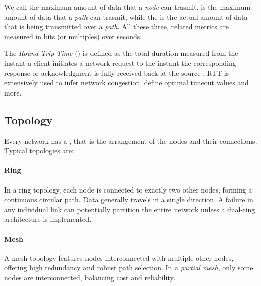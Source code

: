 We call  the maximum amount of data that a \emph{node} can trasmit.
 is the maximum amount of data that a \emph{path} can trasmit, while the  is the actual amount of data that is being transmitted over a \emph{path}.
All these three, related metrics are measured in bits (or multiples) over seconds.

The \emph{Round-Trip Time} () is defined as the total duration measured from the instant a client initiates a network request to the instant the corresponding response or acknowledgment is fully received back at the source \cite{rfc2681}. 
RTT is extensively used to infer network congestion, define optimal timeout values and more.

\subsection{Topology}
Every network has a , that is the arrangement of the nodes and their connections.
Typical topologies are:

\paragraph{Ring}
In a ring topology, each node is connected to exactly two other nodes, forming a continuous circular path. Data generally travels in a single direction. A failure in any individual link can potentially partition the entire network unless a dual-ring architecture is implemented.
\begin{center}
\end{center}

\paragraph{Mesh}
A mesh topology features nodes interconnected with multiple other nodes, offering high redundancy and robust path selection. In a \emph{partial mesh}, only some nodes are interconnected, balancing cost and reliability.
\begin{center}
\end{center}

